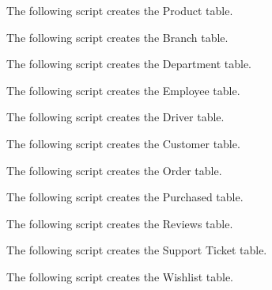 The following script creates the Product table.



The following script creates the Branch table.



The following script creates the Department table.



The following script creates the Employee table.



The following script creates the Driver table.



The following script creates the Customer table.



The following script creates the Order table.



The following script creates the Purchased table.



The following script creates the Reviews table.



The following script creates the Support Ticket table.



The following script creates the Wishlist table.


